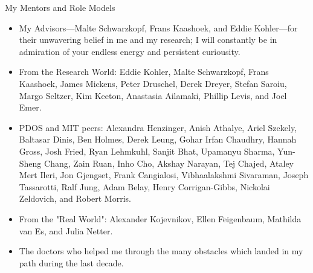 \begin{center}{My Mentors and Role Models}\end{center} 
    \begin{itemize}
        \item My Advisors---Malte Schwarzkopf, Frans Kaashoek, and Eddie
            Kohler---for their unwavering belief in me and my research; I will
            constantly be in admiration of your endless energy and persistent
            curiousity.

        \item From the Research World: Eddie Kohler, Malte Schwarzkopf, Frans
            Kaashoek, James Mickens, Peter Druschel, Derek Dreyer, Stefan
            Saroiu, Margo Seltzer, Kim Keeton, Anastasia Ailamaki, Phillip
            Levis, and Joel Emer.

        \item PDOS and MIT peers: 
Alexandra Henzinger, Anish Athalye, Ariel Szekely, Baltasar Dinis, Ben Holmes,
            Derek Leung, Gohar Irfan Chaudhry, Hannah Gross, Josh Fried, Ryan
            Lehmkuhl, Sanjit Bhat, Upamanyu Sharma, Yun-Sheng Chang, Zain
            Ruan, Inho Cho,
            Akshay Narayan, Tej Chajed, Ataley Mert Ileri, Jon Gjengset, Frank Cangialosi,
            Vibhaalakshmi Sivaraman, Joseph Tassarotti, Ralf Jung, Adam Belay,
            Henry Corrigan-Gibbs, Nickolai Zeldovich, and Robert Morris.

        \item From the "Real World": Alexander Kojevnikov, Ellen Feigenbaum,
            Mathilda van Es, and Julia Netter.
        
        \item The doctors who helped me through the many obstacles which landed in
            my path during the last decade.  
    \end{itemize}
    
